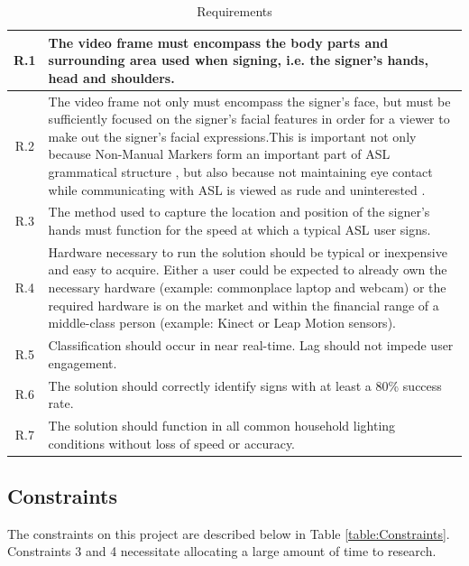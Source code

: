 \documentclass[12pt]{article}
\begin{document}
\begin{table}[h!]
\centering
\caption{Requirements}
\label{table:Requirements}
\vspace{1em}
\begin{tabular}{|c| p{14cm} |}
	\hline
	R.1 & The video frame must encompass the body parts and surrounding area used when signing, i.e. the signer’s hands, head and shoulders. \\ \hline
	R.2 & The video frame not only must encompass the signer’s face, but must be sufficiently focused on the signer’s facial features in order for a viewer to make out the signer’s facial expressions.This is important not only because Non-Manual Markers form an important part of ASL grammatical structure \cite{ASLU}, but also because not maintaining eye contact while communicating with ASL is viewed as rude and uninterested \cite{Expression}. \\ \hline
	R.3 & The method used to capture the location and position of the signer’s hands must function for the speed at which a typical ASL user signs. \\ \hline
	R.4 & Hardware necessary to run the solution should be typical or inexpensive and easy to acquire. Either a user could be expected to already own the necessary hardware (example: commonplace laptop and webcam) or the required hardware is on the market and within the financial range of a middle-class person (example: Kinect or Leap Motion sensors). \\ \hline
	R.5 & Classification should occur in near real-time. Lag should not impede user engagement. \\ \hline
	R.6 & The solution should correctly identify signs with at least a 80\% success rate. \\ \hline
	R.7 & The solution should function in all common household lighting conditions without loss of speed or accuracy. \\ \hline
\end{tabular}
\end{table}

\subsection{Constraints}
The constraints on this project are described below in Table \ref{table:Constraints}. Constraints 3 and 4 necessitate allocating a large amount of time to research.
\end{document}

